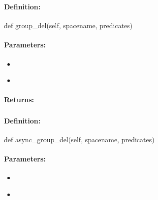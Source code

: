 \pagebreak
\subsubsection{}
\label{api:python:group_del}


\paragraph{Definition:}
\begin{pythoncode}
def group_del(self, spacename, predicates)
\end{pythoncode}

\paragraph{Parameters:}
\begin{itemize}[noitemsep]
\item {}\\

\item {}\\

\end{itemize}

\paragraph{Returns:}


\pagebreak
\subsubsection{}
\label{api:python:async_group_del}


\paragraph{Definition:}
\begin{pythoncode}
def async_group_del(self, spacename, predicates)
\end{pythoncode}

\paragraph{Parameters:}
\begin{itemize}[noitemsep]
\item {}\\

\item {}\\

\end{itemize}

